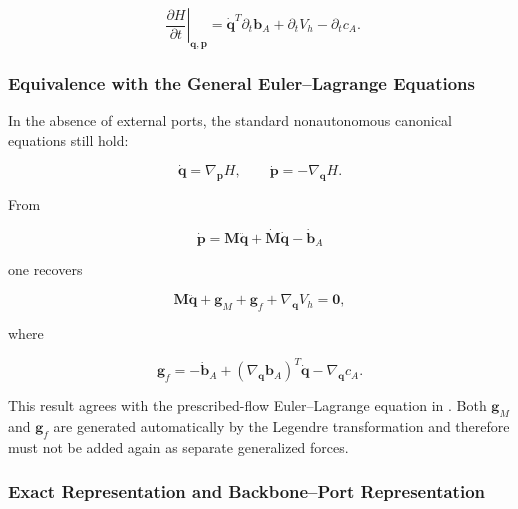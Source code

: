 \begin{equation}
\label{eq:hamiltonian-3-48}
\boxed{\left. \ \ \frac{\partial H}{\partial t} \right|_{\mathbf{q},\mathbf{p}} = {\dot{\mathbf{q}}}^{T}\partial_{t}\mathbf{b}_{A} + \partial_{t}V_{h} - \partial_{t}c_{A}.}
\end{equation}

\subsubsection{Equivalence with the General Euler--Lagrange Equations}\label{sec:hamiltonian-3-5-3}

In the absence of external ports, the standard nonautonomous canonical equations still hold:

\begin{equation}
\label{eq:hamiltonian-3-49}
\dot{\mathbf{q}} = \nabla_{\mathbf{p}}H,\quad\quad\dot{\mathbf{p}} = - \nabla_{\mathbf{q}}H.
\end{equation}

From

\begin{equation}
\label{eq:hamiltonian-3-50}
\dot{\mathbf{p}} = \mathbf{M}\ddot{\mathbf{q}} + \dot{\mathbf{M}}\dot{\mathbf{q}} - {\dot{\mathbf{b}}}_{A}
\end{equation}

one recovers

\begin{equation}
\label{eq:hamiltonian-3-51}
\boxed{\mathbf{M}\ddot{\mathbf{q}} + \mathbf{g}_{M} + \mathbf{g}_{f} + \nabla_{\mathbf{q}}V_{h} = \mathbf{0},}
\end{equation}

where

\begin{equation}
\label{eq:hamiltonian-3-52}
\boxed{\mathbf{g}_{f} = - {\dot{\mathbf{b}}}_{A} + \left( \nabla_{\mathbf{q}}\mathbf{b}_{A} \right)^{T}\dot{\mathbf{q}} - \nabla_{\mathbf{q}}c_{A}.}
\end{equation}

This result agrees with the prescribed-flow Euler--Lagrange equation in . Both \(\mathbf{g}_{M}\) and \(\mathbf{g}_{f}\) are generated automatically by the Legendre transformation and therefore must not be added again as separate generalized forces.

\subsubsection{Exact Representation and Backbone--Port Representation}\label{sec:hamiltonian-3-5-4}

